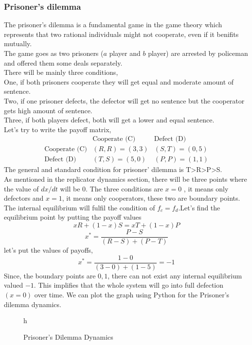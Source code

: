 \documentclass{article}
\begin{document}
\subsubsection{Prisoner's dilemma}
The prisoner's dilemma is a fundamental game in the game theory which represents that two rational individuals might not cooperate, even if it benifits mutually.\\
The game goes as two prisoners ($a$ player and $b$ player) are arrested by policeman and offered them some deals separately.\\
There will be mainly three conditions,\\
One, if both prisoners cooperate they will get equal and moderate amount of sentence.\\
Two, if one prisoner defects, the defector will get no sentence but the cooperator gets high amount of sentence.\\
Three, if both players defect, both will get a lower and equal sentence.\\
Let's try to write the payoff matrix,
\[
\begin{array}{c|cc}
    & \text{Cooperate (C)} & \text{Defect (D)} \\
    \hline
    \text{Cooperate (C)} & (R,R) = (3,3) & (S,T) = (0,5) \\
    \text{Defect (D)} & (T,S) = (5,0) & (P,P) = (1,1)
\end{array}
\]
The general and standard condition for prisoner' dilemma is T>R>P>S.\\
As mentioned in the replicator dynamics section, there will be three points where the value of $dx/dt$ will be $0$. The three conditions are $x=0$ , it means only defectors and $x=1$, it means only cooperators, these two are boundary points.\\
The internal equilibrium will fulfil the condition of $f_c=f_d$.Let's find the equilibrium point by putting the payoff values\\
\[xR+(1-x)S= xT+(1-x)P\]
\[x^*=\frac{P-S}{(R-S)+(P-T)}\]
let's put the values of payoffs,
\[x^*=\frac{1-0}{(3-0)+(1-5)}= -1\]
Since, the boundary points are ${0,1}$, there can not exist any internal equilibrium valued $-1$. This implifies that the whole system will go into full defection $(x=0)$ over time.
We can plot the graph using Python for the Prisoner's dilemma dynamics.\\
\begin{figure}{h}
    \centering
    \caption{Prisoner's Dilemma Dynamics}
    \label{fig: Total Defection in Prisoner' Dilemma}
\end{figure}
\end{document}
